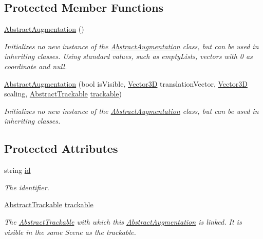 \subsection*{Protected Member Functions}
\begin{DoxyCompactItemize}
\item 
\hyperlink{class_a_rdev_kit_1_1_model_1_1_project_1_1_abstract_augmentation_a6dcd315fd15d4dd67a6910624cb38fb8}{Abstract\-Augmentation} ()
\begin{DoxyCompactList}\small\item\em Initializes no new instance of the \hyperlink{class_a_rdev_kit_1_1_model_1_1_project_1_1_abstract_augmentation}{Abstract\-Augmentation} class, but can be used in inheriting classes. Using standard values, such as empty\-Lists, vectors with 0 as coordinate and null. \end{DoxyCompactList}\item 
\hyperlink{class_a_rdev_kit_1_1_model_1_1_project_1_1_abstract_augmentation_a46d8ded608fcaf37e6597e789c052e52}{Abstract\-Augmentation} (bool is\-Visible, \hyperlink{class_a_rdev_kit_1_1_model_1_1_project_1_1_vector3_d}{Vector3\-D} translation\-Vector, \hyperlink{class_a_rdev_kit_1_1_model_1_1_project_1_1_vector3_d}{Vector3\-D} scaling, \hyperlink{class_a_rdev_kit_1_1_model_1_1_project_1_1_abstract_trackable}{Abstract\-Trackable} \hyperlink{class_a_rdev_kit_1_1_model_1_1_project_1_1_abstract_augmentation_a8d8e3f3c42696008edbfc44d51ba518d}{trackable})
\begin{DoxyCompactList}\small\item\em Initializes no new instance of the \hyperlink{class_a_rdev_kit_1_1_model_1_1_project_1_1_abstract_augmentation}{Abstract\-Augmentation} class, but can be used in inheriting classes. \end{DoxyCompactList}\end{DoxyCompactItemize}
\subsection*{Protected Attributes}
\begin{DoxyCompactItemize}
\item 
string \hyperlink{class_a_rdev_kit_1_1_model_1_1_project_1_1_abstract_augmentation_af0470569d324d3bf199a841be3a3e853}{id}
\begin{DoxyCompactList}\small\item\em The identifier. \end{DoxyCompactList}\item 
\hyperlink{class_a_rdev_kit_1_1_model_1_1_project_1_1_abstract_trackable}{Abstract\-Trackable} \hyperlink{class_a_rdev_kit_1_1_model_1_1_project_1_1_abstract_augmentation_a8d8e3f3c42696008edbfc44d51ba518d}{trackable}
\begin{DoxyCompactList}\small\item\em The \hyperlink{class_a_rdev_kit_1_1_model_1_1_project_1_1_abstract_trackable}{Abstract\-Trackable} with which this \hyperlink{class_a_rdev_kit_1_1_model_1_1_project_1_1_abstract_augmentation}{Abstract\-Augmentation} is linked. It is visible in the same Scene as the trackable. \end{DoxyCompactList}\end{DoxyCompactItemize}
